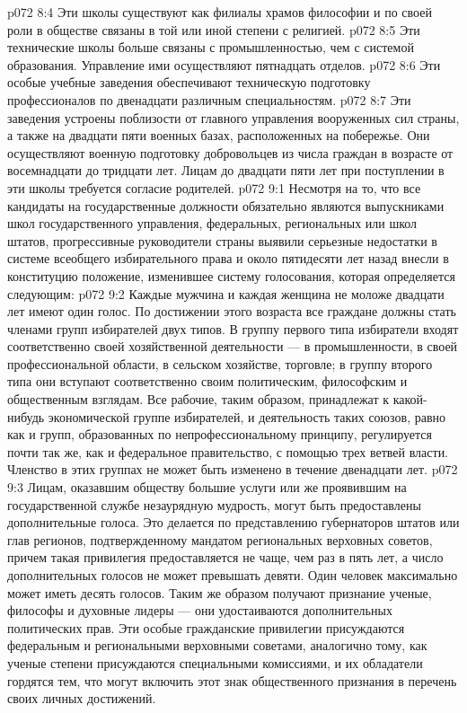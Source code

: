 \vs p072 8:4 \bibnobreakspace {} Эти школы существуют как филиалы храмов философии и по своей роли в обществе связаны в той или иной степени с религией.
\vs p072 8:5 \bibnobreakspace {} Эти технические школы больше связаны с промышленностью, чем с системой образования. Управление ими осуществляют пятнадцать отделов.
\vs p072 8:6 \bibnobreakspace {} Эти особые учебные заведения обеспечивают техническую подготовку профессионалов по двенадцати различным специальностям.
\vs p072 8:7 \bibnobreakspace {} Эти заведения устроены поблизости от главного управления вооруженных сил страны, а также на двадцати пяти военных базах, расположенных на побережье. Они осуществляют военную подготовку добровольцев из числа граждан в возрасте от восемнадцати до тридцати лет. Лицам до двадцати пяти лет при поступлении в эти школы требуется согласие родителей.
\vs p072 9:1 Несмотря на то, что все кандидаты на государственные должности обязательно являются выпускниками школ государственного управления, федеральных, региональных или школ штатов, прогрессивные руководители страны выявили серьезные недостатки в системе всеобщего избирательного права и около пятидесяти лет назад внесли в конституцию положение, изменившее систему голосования, которая определяется следующим:
\vs p072 9:2 \bibnobreakspace Каждые мужчина и каждая женщина не моложе двадцати лет имеют один голос. По достижении этого возраста все граждане должны стать членами групп избирателей двух типов. В группу первого типа избиратели входят соответственно своей хозяйственной деятельности --- в промышленности, в своей профессиональной области, в сельском хозяйстве, торговле; в группу второго типа они вступают соответственно своим политическим, философским и общественным взглядам. Все рабочие, таким образом, принадлежат к какой\hyp{}нибудь экономической группе избирателей, и деятельность таких союзов, равно как и групп, образованных по непрофессиональному принципу, регулируется почти так же, как и федеральное правительство, с помощью трех ветвей власти. Членство в этих группах не может быть изменено в течение двенадцати лет.
\vs p072 9:3 \bibnobreakspace Лицам, оказавшим обществу большие услуги или же проявившим на государственной службе незаурядную мудрость, могут быть предоставлены дополнительные голоса. Это делается по представлению губернаторов штатов или глав регионов, подтвержденному мандатом региональных верховных советов, причем такая привилегия предоставляется не чаще, чем раз в пять лет, а число дополнительных голосов не может превышать девяти. Один человек максимально может иметь десять голосов. Таким же образом получают признание ученые, философы и духовные лидеры --- они удостаиваются дополнительных политических прав. Эти особые гражданские привилегии присуждаются федеральным и региональными верховными советами, аналогично тому, как ученые степени присуждаются специальными комиссиями, и их обладатели гордятся тем, что могут включить этот знак общественного признания в перечень своих личных достижений.
